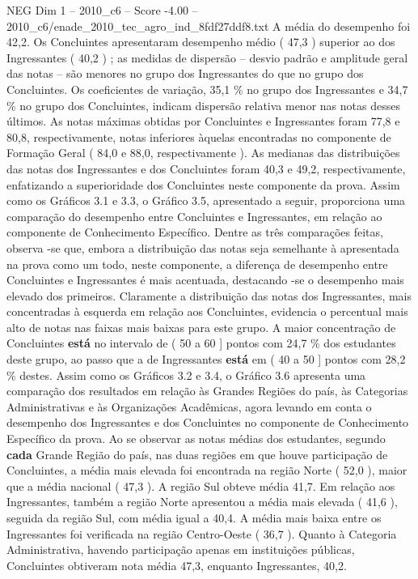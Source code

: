 \begin{textsample}{NEG Dim 1 – 2010\_c6 – Score -4.00 – 2010\_c6/enade\_2010\_tec\_agro\_ind\_8fdf27ddf8.txt}
A média do desempenho foi 42,2.
Os Concluintes apresentaram desempenho médio ( 47,3 ) superior ao dos Ingressantes ( 40,2 ) ; as medidas de dispersão – desvio padrão e amplitude geral das notas – são menores no grupo dos Ingressantes do que no grupo dos Concluintes.
Os coeficientes de variação, 35,1 \% no grupo dos Ingressantes e 34,7 \% no grupo dos Concluintes, indicam dispersão relativa menor nas notas desses últimos.
As notas máximas obtidas por Concluintes e Ingressantes foram 77,8 e 80,8, respectivamente, notas inferiores àquelas encontradas no componente de Formação Geral ( 84,0 e 88,0, respectivamente ).
As medianas das distribuições das notas dos Ingressantes e dos Concluintes foram 40,3 e 49,2, respectivamente, enfatizando a superioridade dos Concluintes neste componente da prova.
Assim como os Gráficos 3.1 e 3.3, o Gráfico 3.5, apresentado a seguir, proporciona uma comparação do desempenho entre Concluintes e Ingressantes, em relação ao componente de Conhecimento Específico.
Dentre as três comparações feitas, observa -se que, embora a distribuição das notas seja semelhante à apresentada na prova como um todo, neste componente, a diferença de desempenho entre Concluintes e Ingressantes é mais acentuada, destacando -se o desempenho mais elevado dos primeiros.
Claramente a distribuição das notas dos Ingressantes, mais concentradas à esquerda em relação aos Concluintes, evidencia o percentual mais alto de notas nas faixas mais baixas para este grupo.
A maior concentração de Concluintes \textbf{está} no intervalo de ( 50 a 60 ] pontos com 24,7 \% dos estudantes deste grupo, ao passo que a de Ingressantes \textbf{está} em ( 40 a 50 ] pontos com 28,2 \% destes.
Assim como os Gráficos 3.2 e 3.4, o Gráfico 3.6 apresenta uma comparação dos resultados em relação às Grandes Regiões do país, às Categorias Administrativas e às Organizações Acadêmicas, agora levando em conta o desempenho dos Ingressantes e dos Concluintes no componente de Conhecimento Específico da prova.
Ao se observar as notas médias dos estudantes, segundo \textbf{cada} Grande Região do país, nas duas regiões em que houve participação de Concluintes, a média mais elevada foi encontrada na região Norte ( 52,0 ), maior que a média nacional ( 47,3 ).
A região Sul obteve média 41,7.
Em relação aos Ingressantes, também a região Norte apresentou a média mais elevada ( 41,6 ), seguida da região Sul, com média igual a 40,4.
A média mais baixa entre os Ingressantes foi verificada na região Centro-Oeste ( 36,7 ).
Quanto à Categoria Administrativa, havendo participação apenas em instituições públicas, Concluintes obtiveram nota média 47,3, enquanto Ingressantes, 40,2.

\end{textsample}
